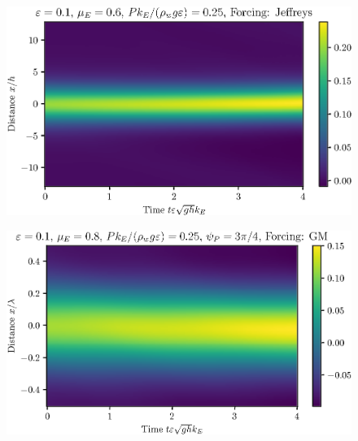 \documentclass{jfm}
\begin{document}
\begin{figure}
  \centering
  \includegraphics{Spacetime-Mesh_solitary.eps}
  \caption{}
\end{figure}

\begin{figure}
  \centering
  \includegraphics{Spacetime-Mesh_GM.eps}
  \caption{}
\end{figure}
\end{document}
